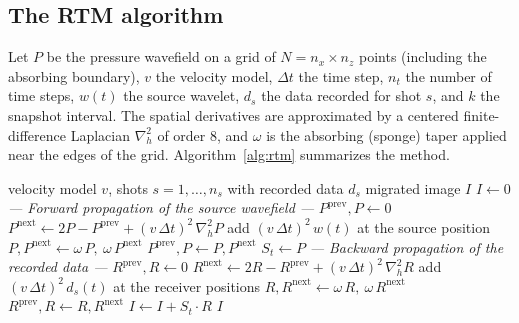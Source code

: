 \documentclass[letterpaper,11pt,leqno]{article}
\begin{document}
\subsection{The RTM algorithm}

Let $P$ be the pressure wavefield on a grid of $N = n_x \times n_z$ points
(including the absorbing boundary), $v$ the velocity model, $\Delta t$ the time
step, $n_t$ the number of time steps, $w(t)$ the source wavelet, $d_s$ the data
recorded for shot $s$, and $k$ the snapshot interval. The spatial derivatives
are approximated by a centered finite-difference Laplacian $\nabla_h^2$ of order
8, and $\omega$ is the absorbing (sponge) taper applied near the edges of the
grid. Algorithm~\ref{alg:rtm} summarizes the method.

\begin{algorithm}[htbp]
\caption{Shot-profile Reverse Time Migration with a zero-lag cross-correlation
imaging condition}
\label{alg:rtm}
\begin{algorithmic}[1]
\Require velocity model $v$, shots $s = 1,\dots,n_s$ with recorded data $d_s$
\Ensure migrated image $I$
\State $I \gets 0$
    \Statex \hspace{\algorithmicindent}\textit{--- Forward propagation of the source wavefield ---}
    \State $P^{\mathrm{prev}}, P \gets 0$
        \State $P^{\mathrm{next}} \gets 2P - P^{\mathrm{prev}}
               + (v\,\Delta t)^2\,\nabla_h^2 P$
               \label{alg:forward-update}
        \State add $(v\,\Delta t)^2\,w(t)$ at the source position
        \State $P, P^{\mathrm{next}} \gets \omega\,P,\ \omega\,P^{\mathrm{next}}$
        \State $P^{\mathrm{prev}}, P \gets P, P^{\mathrm{next}}$
            \State $S_{t} \gets P$ 
        \EndIf
    \EndFor
    \Statex \hspace{\algorithmicindent}\textit{--- Backward propagation of the recorded data ---}
    \State $R^{\mathrm{prev}}, R \gets 0$
        \State $R^{\mathrm{next}} \gets 2R - R^{\mathrm{prev}}
               + (v\,\Delta t)^2\,\nabla_h^2 R$
               \label{alg:backward-update}
        \State add $(v\,\Delta t)^2\,d_s(t)$ at the receiver positions
        \State $R, R^{\mathrm{next}} \gets \omega\,R,\ \omega\,R^{\mathrm{next}}$
        \State $R^{\mathrm{prev}}, R \gets R, R^{\mathrm{next}}$
            \State $I \gets I + S_{t} \cdot R$
        \EndIf
    \EndFor
\EndFor
\State \Return $I$
\end{algorithmic}
\end{algorithm}
\end{document}
